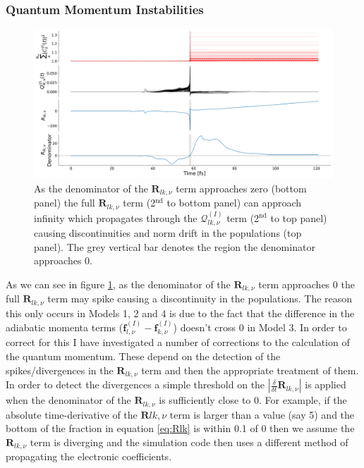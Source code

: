 \subsubsection{Quantum Momentum Instabilities}
\label{sect:QlkSpikes}
\begin{figure}[h]
	\includegraphics[width=\textwidth]{./img/CTMQC/TullyModels/Spikes/RlkDenom_Rlk_Qlk_Norm.png}
	\caption{\label{fig:QlkSpike}As the denominator of the $\mathbf{R}_{lk,\nu}$ term approaches zero (bottom panel) the full $\mathbf{R}_{lk, \nu}$ term (2$^{\text{nd}}$ to bottom panel) can approach infinity which propagates through the $\mathcal{Q}_{lk, \nu}^{(I)}$ term (2$^{\text{nd}}$ to top panel) causing discontinuities and norm drift in the populations (top panel). The grey vertical bar denotes the region the denominator approaches 0.}
\end{figure}
\noindent As we can see in figure \ref{fig:QlkSpike}, as the denominator of the $\mathbf{R}_{lk, \nu}$ term approaches 0 the full $\mathbf{R}_{lk, \nu}$ term may spike causing a discontinuity in the populations. The reason this only occurs in Models 1, 2 and 4 is due to the fact that the difference in the adiabatic momenta terms ($\mathbf{f}_{l, \nu}^{(I)} - \mathbf{f}_{k, \nu}^{(I)}$) doesn't cross 0 in Model 3. In order to correct for this I have investigated a number of corrections to the calculation of the quantum momentum. These depend on the detection of the spikes/divergences in the $\mathbf{R}_{lk, \nu}$ term and then the appropriate treatment of them. In order to detect the divergences a simple threshold on the $|\frac{\delta}{\delta t} \mathbf{R}_{lk, \nu}|$ is applied when the denominator of the $\mathbf{R}_{lk, \nu}$ is sufficiently close to 0. For example, if the absolute time-derivative of the $\mathbf{R}{lk, \nu}$ term is larger than a value (say 5) and the bottom of the fraction in equation \eqref{eq:Rlk} is within 0.1 of 0 then we assume the $\mathbf{R}_{lk, \nu}$ term is diverging and the simulation code then uses a different method of propagating the electronic coefficients.
